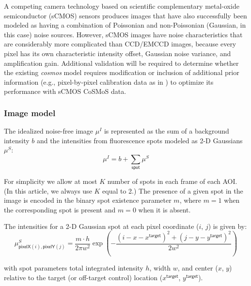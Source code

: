 A competing camera technology based on scientific complementary metal-oxide semiconductor (sCMOS) sensors produces images that have also successfully been modeled as having a combination of Poissonian and non-Poissonian (Gaussian, in this case) noise sources. However, sCMOS images have noise characteristics that are considerably more complicated than CCD/EMCCD images, because every pixel has its own characteristic intensity offset, Gaussian noise variance, and amplification gain. Additional validation will be required to determine whether the existing \emph{cosmos} model requires modification or inclusion of additional prior information (e.g., pixel-by-pixel calibration data as in \cite{Huang2013-bx}) to optimize its performance with sCMOS CoSMoS data.

\subsubsection{Image model}

The idealized noise-free image $\mu^I$ is represented  as the sum of a background intensity $b$ and the intensities from fluorescence spots modeled as  2-D Gaussians $\mu^S$:
%
\begin{equation}
    \mu^I = b + \sum_{\mathsf{spot}} \mu^S
\end{equation}

\noindent
For simplicity we allow at most $K$ number of spots in each frame of each AOI.  (In this article, we always use $K$ equal to 2.)  The presence of a given spot in the image is encoded in the binary spot existence parameter $m$, where $m = 1$ when the corresponding spot is present and $m = 0$ when it is absent.

The intensities for a 2-D Gaussian spot at each pixel coordinate ($i$, $j$) is given by:
%
\begin{equation}
    \mu^S_{\mathsf{pixelX}(i), \mathsf{pixelY}(j)} = \dfrac{m \cdot h}{2 \pi w^2} \exp{\left( -\dfrac{(i-x-x^\mathsf{target})^2 + (j-y-y^\mathsf{target})^2}{2 w^2} \right)}
\end{equation}

\noindent
with spot parameters total integrated intensity $h$, width $w$, and center ($x$, $y$) relative to the target (or off-target control) location ($x^\mathsf{target}$, $y^\mathsf{target}$). 
%

